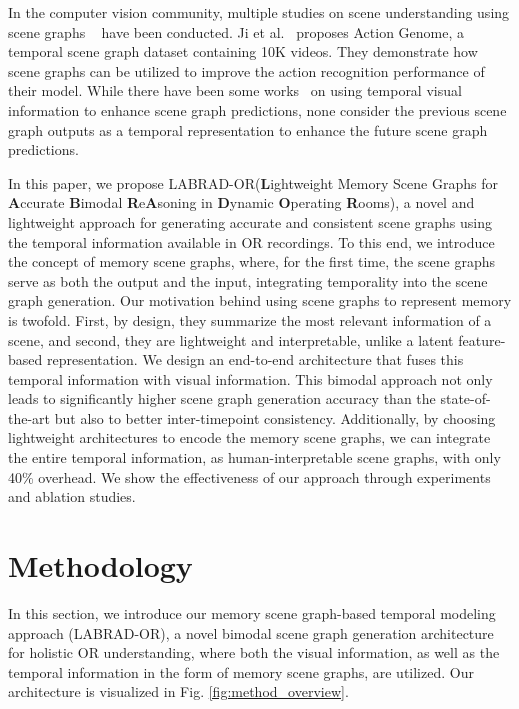 \documentclass[runningheads]{llncs}
\begin{document}
In the computer vision community, multiple studies on scene understanding using scene graphs ~\cite{imp,3dssg} have been conducted. Ji et al.~\cite{action_genome} proposes Action Genome, a temporal scene graph dataset containing 10K videos. They demonstrate how scene graphs can be utilized to improve the action recognition performance of their model. While there have been some works~\cite{teng2021target,cong2021spatial} on using temporal visual information to enhance scene graph predictions, none consider the previous scene graph outputs as a temporal representation to enhance the future scene graph predictions.

In this paper, we propose LABRAD-OR(\textbf{L}ightweight Memory Scene Graphs for \textbf{A}ccurate \textbf{B}imodal \textbf{R}e\textbf{A}soning in \textbf{D}ynamic \textbf{O}perating \textbf{R}ooms), a novel and lightweight approach for generating accurate and consistent scene graphs using the temporal information available in OR recordings. To this end, we introduce the concept of memory scene graphs, where, for the first time, the scene graphs serve as both the output and the input, integrating temporality into the scene graph generation. Our motivation behind using scene graphs to represent memory is twofold. First, by design, they summarize the most relevant information of a scene, and second, they are lightweight and interpretable, unlike a latent feature-based representation. We design an end-to-end architecture that fuses this temporal information with visual information. This bimodal approach not only leads to significantly higher scene graph generation accuracy than the state-of-the-art but also to better inter-timepoint consistency. Additionally, by choosing lightweight architectures to encode the memory scene graphs, we can integrate the entire temporal information, as human-interpretable scene graphs, with only 40\% overhead. We show the effectiveness of our approach through experiments and ablation studies.

\section{Methodology}
In this section, we introduce our memory scene graph-based temporal modeling approach (LABRAD-OR), a novel bimodal scene graph generation architecture for holistic OR understanding, where both the visual information, as well as the temporal information in the form of memory scene graphs, are utilized. Our architecture is visualized in Fig. \ref{fig:method_overview}. 
\end{document}

